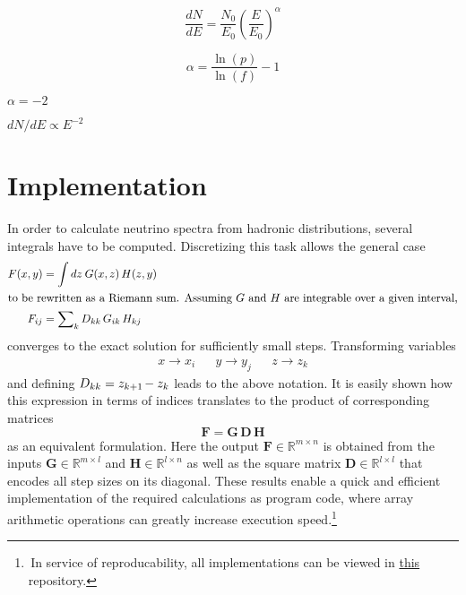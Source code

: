 \begin{equation*}
	\frac{dN}{dE} = \frac{N_0}{E_0} \left( \frac{E}{E_0} \right)^\alpha
\end{equation*}

\begin{equation*}
	\alpha = \frac{\ln(p)}{\ln(f)} - 1
\end{equation*}

$\alpha = -2$

$dN / dE \propto E^{-2}$



\section{Implementation}
\label{sec:implementation}

In order to calculate neutrino spectra from hadronic distributions, several integrals have to be computed. Discretizing
this task allows the general case
\begin{align*}
	F(x, y) &= \int dz \: G(x, z) \, H(z, y) \\
	\intertext{to be rewritten as a Riemann sum. Assuming $G$ and $H$ are integrable over a given interval,}
	F_{ij} &= \sum\nolimits_k D_{kk} \, G_{ik} \, H_{kj}
\end{align*}
converges to the exact solution for sufficiently small steps. Transforming variables
\begin{align*}
	&&&& x \rightarrow x_i && y \rightarrow y_j && z \rightarrow z_k &&&&
\end{align*}
and defining $D_{kk} = z_{k+1} \kern-1.0pt - z_k$ leads to the above notation. It is easily shown how this expression in terms of
indices translates to the product of corresponding matrices
\begin{equation*}
	\bm{F} = \bm{G} \, \bm{D} \, \bm{H}
\end{equation*}
as an equivalent formulation. Here the output $\bm{F} \in \mathbb{R}^{m \times n}$ is obtained from the inputs
$\bm{G} \in \mathbb{R}^{m \times l}$ and $\bm{H} \in \mathbb{R}^{l \times n}$ as well as the square matrix
$\bm{D} \in \mathbb{R}^{l \times l}$ that encodes all step sizes on its diagonal. These results enable a quick and
efficient implementation of the required calculations as program code, where array arithmetic operations can greatly
increase execution speed.\footnote{$\,$In service of reproducability, all implementations can be viewed in
\href{https://github.com/fritzali/bachelor}{this} repository.}

